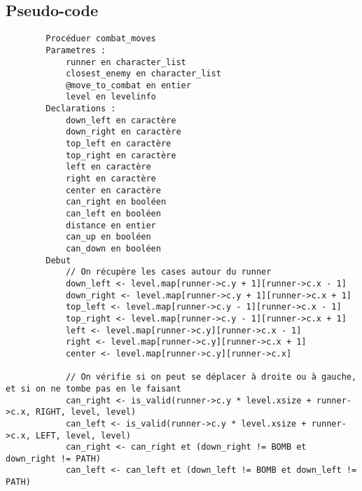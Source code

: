 \newpage

\subsection{Pseudo-code}

\begin{longlisting}
    \begin{verbatim}
        Procéduer combat_moves
        Parametres :
            runner en character_list
            closest_enemy en character_list
            @move_to_combat en entier 
            level en levelinfo
        Declarations :
            down_left en caractère
            down_right en caractère
            top_left en caractère
            top_right en caractère
            left en caractère
            right en caractère
            center en caractère
            can_right en booléen
            can_left en booléen
            distance en entier
            can_up en booléen
            can_down en booléen
        Debut
            // On récupère les cases autour du runner
            down_left <- level.map[runner->c.y + 1][runner->c.x - 1]
            down_right <- level.map[runner->c.y + 1][runner->c.x + 1]
            top_left <- level.map[runner->c.y - 1][runner->c.x - 1]
            top_right <- level.map[runner->c.y - 1][runner->c.x + 1]
            left <- level.map[runner->c.y][runner->c.x - 1]
            right <- level.map[runner->c.y][runner->c.x + 1]
            center <- level.map[runner->c.y][runner->c.x]

            // On vérifie si on peut se déplacer à droite ou à gauche, et si on ne tombe pas en le faisant
            can_right <- is_valid(runner->c.y * level.xsize + runner->c.x, RIGHT, level, level)
            can_left <- is_valid(runner->c.y * level.xsize + runner->c.x, LEFT, level, level)
            can_right <- can_right et (down_right != BOMB et down_right != PATH)
            can_left <- can_left et (down_left != BOMB et down_left != PATH)


\end{verbatim}
\end{longlisting}

